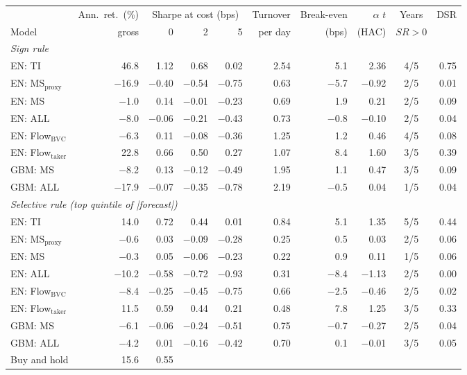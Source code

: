 \begin{tabular}{lrrrrrrrcr}
\toprule
& Ann.\ ret.\ (\%) & \multicolumn{3}{c}{Sharpe at cost (bps)} & Turnover & Break-even & $\alpha$ $t$ & Years & DSR\\
\cmidrule(lr){3-5} Model & gross & 0 & 2 & 5 & per day & (bps) & (HAC) & $SR>0$ & \\
\midrule
\multicolumn{10}{l}{\emph{Sign rule}}\\
EN: TI & 46.8 & 1.12 & 0.68 & 0.02 & 2.54 & 5.1 & 2.36 & 4/5 & 0.75\\
EN: MS$_{\text{proxy}}$ & \ensuremath{-}16.9 & \ensuremath{-}0.40 & \ensuremath{-}0.54 & \ensuremath{-}0.75 & 0.63 & \ensuremath{-}5.7 & \ensuremath{-}0.92 & 2/5 & 0.01\\
EN: MS & \ensuremath{-}1.0 & 0.14 & \ensuremath{-}0.01 & \ensuremath{-}0.23 & 0.69 & 1.9 & 0.21 & 2/5 & 0.09\\
EN: ALL & \ensuremath{-}8.0 & \ensuremath{-}0.06 & \ensuremath{-}0.21 & \ensuremath{-}0.43 & 0.73 & \ensuremath{-}0.8 & \ensuremath{-}0.10 & 2/5 & 0.04\\
EN: Flow$_{\text{BVC}}$ & \ensuremath{-}6.3 & 0.11 & \ensuremath{-}0.08 & \ensuremath{-}0.36 & 1.25 & 1.2 & 0.46 & 4/5 & 0.08\\
EN: Flow$_{\text{taker}}$ & 22.8 & 0.66 & 0.50 & 0.27 & 1.07 & 8.4 & 1.60 & 3/5 & 0.39\\
GBM: MS & \ensuremath{-}8.2 & 0.13 & \ensuremath{-}0.12 & \ensuremath{-}0.49 & 1.95 & 1.1 & 0.47 & 3/5 & 0.09\\
GBM: ALL & \ensuremath{-}17.9 & \ensuremath{-}0.07 & \ensuremath{-}0.35 & \ensuremath{-}0.78 & 2.19 & \ensuremath{-}0.5 & 0.04 & 1/5 & 0.04\\
\multicolumn{10}{l}{\emph{Selective rule (top quintile of |forecast|)}}\\
EN: TI & 14.0 & 0.72 & 0.44 & 0.01 & 0.84 & 5.1 & 1.35 & 5/5 & 0.44\\
EN: MS$_{\text{proxy}}$ & \ensuremath{-}0.6 & 0.03 & \ensuremath{-}0.09 & \ensuremath{-}0.28 & 0.25 & 0.5 & 0.03 & 2/5 & 0.06\\
EN: MS & \ensuremath{-}0.3 & 0.05 & \ensuremath{-}0.06 & \ensuremath{-}0.23 & 0.22 & 0.9 & 0.11 & 1/5 & 0.06\\
EN: ALL & \ensuremath{-}10.2 & \ensuremath{-}0.58 & \ensuremath{-}0.72 & \ensuremath{-}0.93 & 0.31 & \ensuremath{-}8.4 & \ensuremath{-}1.13 & 2/5 & 0.00\\
EN: Flow$_{\text{BVC}}$ & \ensuremath{-}8.4 & \ensuremath{-}0.25 & \ensuremath{-}0.45 & \ensuremath{-}0.75 & 0.66 & \ensuremath{-}2.5 & \ensuremath{-}0.46 & 2/5 & 0.02\\
EN: Flow$_{\text{taker}}$ & 11.5 & 0.59 & 0.44 & 0.21 & 0.48 & 7.8 & 1.25 & 3/5 & 0.33\\
GBM: MS & \ensuremath{-}6.1 & \ensuremath{-}0.06 & \ensuremath{-}0.24 & \ensuremath{-}0.51 & 0.75 & \ensuremath{-}0.7 & \ensuremath{-}0.27 & 2/5 & 0.04\\
GBM: ALL & \ensuremath{-}4.2 & 0.01 & \ensuremath{-}0.16 & \ensuremath{-}0.42 & 0.70 & 0.1 & \ensuremath{-}0.01 & 3/5 & 0.05\\
\midrule
Buy and hold & 15.6 & 0.55 & & & & & & & \\
\bottomrule
\end{tabular}

